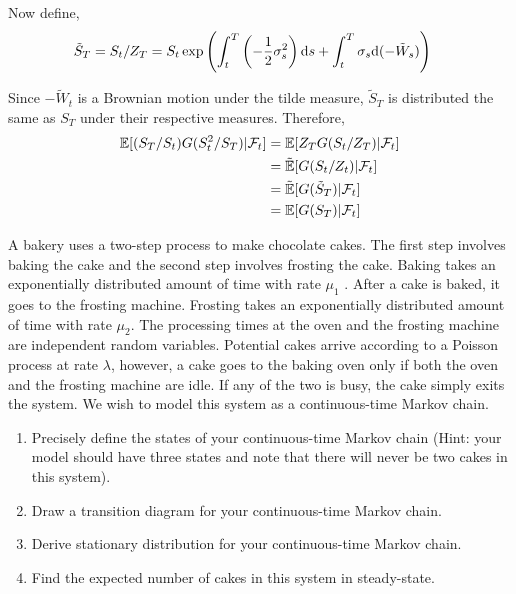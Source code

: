 \begin{solution}[Solution]
\begin{enumerate}[label=(\alph*)]
        Now define,
        \begin{align*}
            \tilde{S}_T = S_t/Z_T &= S_t \exp \left( \int_{t}^{T} \left( -\frac{1}{2}\sigma_s^2 \right)\mathrm{d} s + \int_{t}^{T} \sigma_s \mathrm{d} (-\tilde{W}_s) \right)
        \end{align*}
       
        Since \( -\tilde{W}_t \) is a Brownian motion under the tilde measure, \( \tilde{S}_T \) is distributed the same as \( S_T \) under their respective measures. 
        Therefore,
        \begin{align*}
            \mathbb{E}[(S_T/S_t) G(S_t^2/S_T) | \mathcal{F}_t] 
            &= \mathbb{E}[Z_T G(S_t/Z_T) | \mathcal{F}_t] 
            \\&= \tilde{\mathbb{E}}[ G(S_t/Z_t) | \mathcal{F}_t] 
            \\&= \tilde{\mathbb{E}}[G(\tilde{S}_T) | \mathcal{F}_t]
            \\&= \mathbb{E}[G(S_T)|\mathcal{F}_t]
        \end{align*}
        
                



\end{enumerate}
\end{solution}


\begin{problem}
A bakery uses a two-step process to make chocolate cakes. The first step involves baking the cake and the second step involves frosting the cake. Baking takes an exponentially distributed amount of time with rate \( \mu_1 \) . After a cake is baked, it goes to the frosting machine. Frosting takes an exponentially distributed amount of time with rate \( \mu_2 \). The processing times at the oven and the frosting machine are independent random variables. Potential cakes arrive according to a Poisson process at rate \( \lambda \), however, a cake goes to the baking oven only if both the oven and the frosting machine are idle. If any of the two is busy, the cake simply exits the system. We wish to model this system as a continuous-time Markov chain.
\begin{enumerate}[nolistsep,label=(\alph*)]
    \item Precisely define the states of your continuous-time Markov chain (Hint: your model should have three states and note that there will never be two cakes in this system).
    \item Draw a transition diagram for your continuous-time Markov chain.
    \item Derive stationary distribution for your continuous-time Markov chain.
    \item Find the expected number of cakes in this system in steady-state.
\end{enumerate}
\end{problem}

